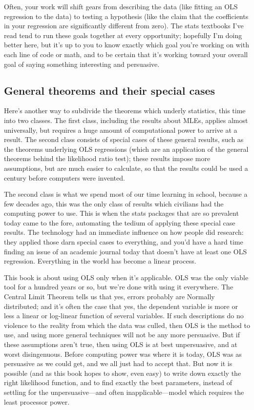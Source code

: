 \documentclass[12pt,notitlepage, openany]{book}
\begin{document}
Often, your work will shift
gears from describing the data (like fitting an OLS regression to the
data) to testing a hypothesis (like the claim that the coefficients
in your regression are significantly different from zero). The stats
textbooks I've read tend to run these goals together at every opportunity;
hopefully I'm doing better here, but it's up to you to know exactly
which goal you're working on with each line of code or math, and to be
certain that it's working toward your overall goal of saying something
interesting and persuasive.

\subsection{General theorems and their special cases}
Here's another way to subdivide the theorems which underly
statistics, this time into two classes. The first class, including the
results about MLEs, applies almost universally, but requires a huge
amount of computational power to arrive at a result. The second class
consists of special cases of these general results, such as the theorems
underlying OLS regressions (which are an application of the general
theorems behind the likelihood ratio test); these results impose more
assumptions, but are much easier to calculate, so that the results could
be used a century before computers were invented.

The second class is what we spend most of our time learning in school,
because a few decades ago, this was the only class of results which
civilians had the computing power to use. This is when the stats packages
that are so prevalent today came to the fore, automating the tedium of
applying these special case results. The technology had an immediate
influence on how people did research: they applied those darn special
cases to everything, and you'd have a hard time finding an issue of an
academic journal today that doesn't have at least one OLS regression.
Everything in the world has become a linear process.

This book is about using OLS only when it's applicable. OLS was the only
viable tool for a hundred years or so, but we're done with using it everywhere.
The Central Limit Theorem tells us that yes, errors probably are
Normally distributed; and it's often the case that yes, the dependent
variable is more or less a linear or log-linear function of several
variables. If such descriptions do no violence to the reality from
which the data was culled, then OLS is the method to use, and using
more general techniques will not be any more persuasive. But if these
assumptions aren't true, then using OLS is at best unpersuasive, and at
worst disingenuous. Before computing power was where it is today, OLS was
as persuasive as we could get, and we all just had to accept that. But
now it is possible (and as this book hopes to show, even easy) to write
down exactly the right likelihood function, and to find exactly the best
parameters, instead of settling for the unpersuasive---and often
inapplicable---model which requires the least processor power.
\end{document}
